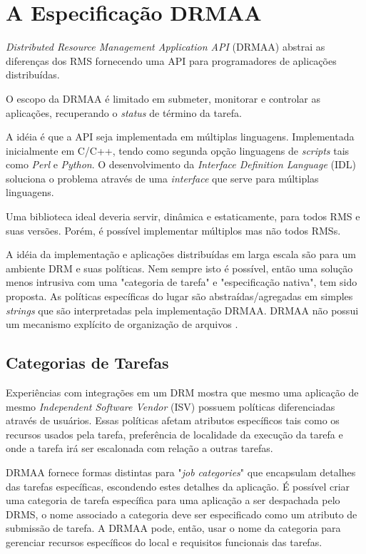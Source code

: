 \chapter{A Especificação DRMAA}
\label{cap:drmaa}

\emph{Distributed Resource Management Application API} (DRMAA) abstrai as diferenças dos RMS fornecendo uma API para programadores de aplicações distribuídas. 

O escopo da DRMAA é limitado em submeter, monitorar e controlar as aplicações, recuperando o \emph{status} de término da tarefa.

A idéia é que a API seja implementada em múltiplas linguagens. Implementada inicialmente em C/C++, tendo como segunda opção linguagens de \emph{scripts} tais como \emph{Perl} e \emph{Python}. O desenvolvimento da \emph{Interface Definition Language} (IDL) soluciona o problema através de uma \emph{interface} que serve para múltiplas linguagens.

Uma biblioteca ideal deveria servir, dinâmica e estaticamente, para todos RMS e suas versões. Porém, é possível implementar múltiplos mas não todos RMSs.

A idéia da implementação e aplicações distribuídas em larga escala são para um ambiente DRM e suas políticas. Nem sempre isto é possível, então uma solução menos intrusiva com uma "categoria de tarefa" e "especificação nativa", tem sido proposta. As políticas específicas do lugar são abstraídas/agregadas em simples \emph{strings} que são interpretadas pela implementação DRMAA. DRMAA não possui um mecanismo explícito de organização de arquivos  \cite{Rajic2004}. 

\section{Categorias de Tarefas}

Experiências com integrações em um DRM mostra que mesmo uma aplicação de mesmo \emph{Independent Software Vendor} (ISV) possuem políticas diferenciadas através de usuários. Essas políticas afetam atributos específicos tais como os recursos usados pela tarefa, preferência de localidade da execução da tarefa e onde a tarefa irá ser escalonada com relação a outras tarefas.

DRMAA fornece formas distintas para "\emph{job categories}" que encapsulam detalhes das tarefas específicas, escondendo estes detalhes da aplicação. É possível criar uma categoria de tarefa específica para uma aplicação a ser despachada pelo DRMS, o nome associado a categoria deve ser especificado como um atributo de submissão de tarefa. A DRMAA pode, então, usar o nome da categoria para gerenciar recursos específicos do local e requisitos funcionais das tarefas.

